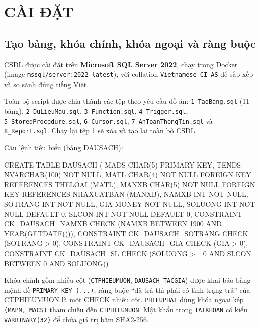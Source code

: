 \documentclass[13pt,a4paper,oneside]{extreport}
\begin{document}
\chapter{CÀI ĐẶT}
\section{Tạo bảng, khóa chính, khóa ngoại và ràng buộc}
CSDL được cài đặt trên \textbf{Microsoft SQL Server 2022}, chạy trong Docker (image \texttt{mssql/server:2022-latest}), với collation \texttt{Vietnamese\_CI\_AS} để sắp xếp và so sánh đúng tiếng Việt. {\sloppy Toàn bộ script được chia thành các tệp theo yêu cầu đồ án: \texttt{1\_TaoBang.sql} (11 bảng), \texttt{2\_DuLieuMau.sql}, \texttt{3\_Function.sql}, \texttt{4\_Trigger.sql}, \texttt{5\_StoredProcedure.sql}, \texttt{6\_Cursor.sql}, \texttt{7\_AnToanThongTin.sql} và \texttt{8\_Report.sql}. Chạy lại tệp 1 sẽ xóa và tạo lại toàn bộ CSDL.\par} Câu lệnh tiêu biểu (bảng DAUSACH):

\begin{sql}
CREATE TABLE DAUSACH (
  MADS    CHAR(5)       PRIMARY KEY,
  TENDS   NVARCHAR(100) NOT NULL,
  MATL    CHAR(4) NOT NULL FOREIGN KEY REFERENCES THELOAI (MATL),
  MANXB   CHAR(5) NOT NULL FOREIGN KEY REFERENCES NHAXUATBAN (MANXB),
  NAMXB   INT NOT NULL,  SOTRANG INT NOT NULL,  GIA MONEY NOT NULL,
  SOLUONG INT NOT NULL DEFAULT 0,  SLCON INT NOT NULL DEFAULT 0,
  CONSTRAINT CK_DAUSACH_NAMXB CHECK (NAMXB BETWEEN 1900 AND YEAR(GETDATE())),
  CONSTRAINT CK_DAUSACH_SOTRANG CHECK (SOTRANG > 0),
  CONSTRAINT CK_DAUSACH_GIA   CHECK (GIA > 0),
  CONSTRAINT CK_DAUSACH_SL    CHECK (SOLUONG >= 0
                              AND SLCON BETWEEN 0 AND SOLUONG))
\end{sql}
Khóa chính gồm nhiều cột (\texttt{CTPHIEUMUON}, \texttt{DAUSACH\_TACGIA}) được khai báo bằng mệnh đề \texttt{PRIMARY KEY (...)}; ràng buộc ``đã trả thì phải có tình trạng trả'' của CTPHIEUMUON là một CHECK nhiều cột. \texttt{PHIEUPHAT} dùng khóa ngoại kép \texttt{(MAPM, MACS)} tham chiếu đến \texttt{CTPHIEUMUON}. Mật khẩu trong \texttt{TAIKHOAN} có kiểu \texttt{VARBINARY(32)} để chứa giá trị băm SHA2-256.
\end{document}
